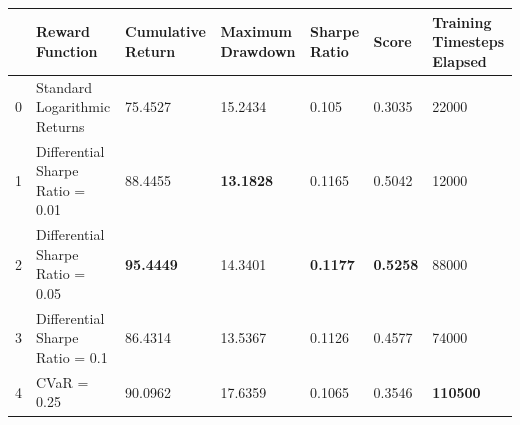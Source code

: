 \begin{tabular}{lllllll}
\toprule
 & Reward Function & Cumulative Return & Maximum Drawdown & Sharpe Ratio & Score & Training Timesteps Elapsed \\
\midrule
0 & Standard Logarithmic Returns & 75.4527 & 15.2434 & 0.105 & 0.3035 & 22000 \\
1 & Differential Sharpe Ratio = 0.01 & 88.4455 & \textbf{13.1828} & 0.1165 & 0.5042 & 12000 \\
2 & Differential Sharpe Ratio = 0.05 & \textbf{95.4449} & 14.3401 & \textbf{0.1177} & \textbf{0.5258} & 88000 \\
3 & Differential Sharpe Ratio = 0.1 & 86.4314 & 13.5367 & 0.1126 & 0.4577 & 74000 \\
4 & CVaR = 0.25 & 90.0962 & 17.6359 & 0.1065 & 0.3546 & \textbf{110500} \\
\bottomrule
\end{tabular}
